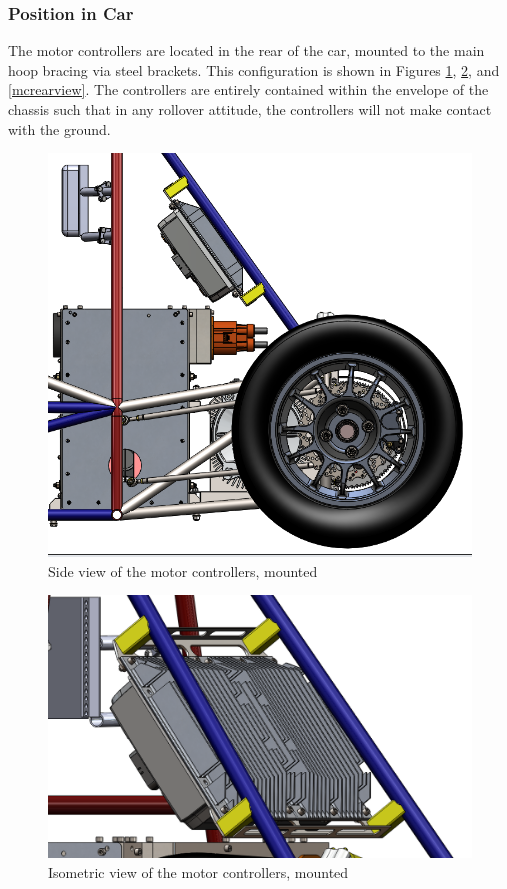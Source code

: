 \documentclass{article}
\begin{document}
        \subsubsection{Position in Car}

            The motor controllers are located in the rear of the car, mounted to the main hoop bracing via steel brackets. This configuration is shown in Figures \ref{mcsideview}, \ref{mciso}, and \ref{mcrearview}. The controllers are entirely contained within the envelope of the chassis such that in any rollover attitude, the controllers will not make contact with the ground.

            \begin{figure}[H]
                \centering
                \includegraphics[width = 0.6 \textwidth]{motorcontroller_sideview}
                \caption{Side view of the motor controllers, mounted}
                \label{mcsideview}
            \end{figure}

            \begin{figure}[H]
                \centering
                \includegraphics[width = 0.6 \textwidth]{motorcontroller_isoview}
                \caption{Isometric view of the motor controllers, mounted}
                \label{mciso}
            \end{figure}
\end{document}
